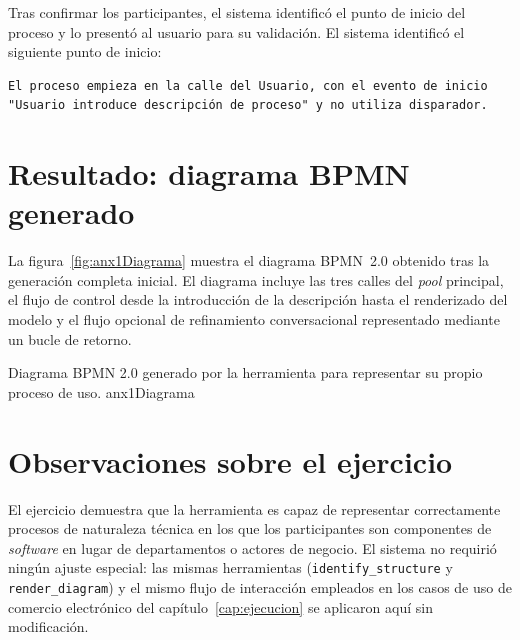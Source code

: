 Tras confirmar los participantes, el sistema identificó el punto de inicio del proceso y lo presentó al usuario para su validación. El sistema identificó el siguiente punto de inicio: 

\begin{lstlisting}[style=promptbox]
El proceso empieza en la calle del Usuario, con el evento de inicio
"Usuario introduce descripción de proceso" y no utiliza disparador.
\end{lstlisting}


\section{Resultado: diagrama BPMN generado}
\label{sec:anx1-resultado}

La figura~\ref{fig:anx1Diagrama} muestra el diagrama BPMN~2.0 obtenido tras la generación completa inicial. El diagrama incluye las tres calles del \textit{pool} principal, el flujo de control desde la introducción de la descripción hasta el renderizado del modelo y el flujo opcional de refinamiento conversacional representado mediante un bucle de retorno.

%
  {Diagrama BPMN 2.0 generado por la herramienta para representar su propio proceso de uso.}%
  {anx1Diagrama}

\section{Observaciones sobre el ejercicio}
\label{sec:anx1-observaciones}

El ejercicio demuestra que la herramienta es capaz de representar correctamente procesos de naturaleza técnica en los que los participantes son componentes de \textit{software} en lugar de departamentos o actores de negocio. El sistema no requirió ningún ajuste especial: las mismas herramientas (\texttt{identify\_structure} y \texttt{render\_diagram}) y el mismo flujo de interacción empleados en los casos de uso de comercio electrónico del capítulo~\ref{cap:ejecucion} se aplicaron aquí sin modificación.